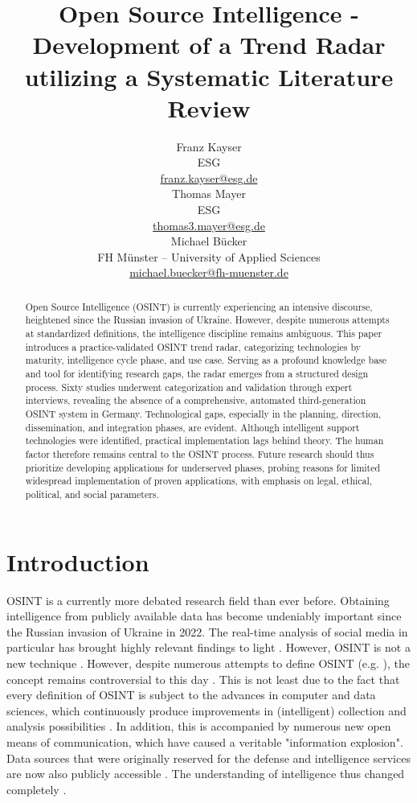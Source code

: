 \documentclass[10pt]{article}
\title{Open Source Intelligence - Development of a Trend Radar utilizing a Systematic Literature Review}
\author{Franz Kayser \\
  ESG \\
  {\underline{ franz.kayser@esg.de}} \\\And
  Thomas Mayer \\
  ESG  \\
  {\underline{ thomas3.mayer@esg.de} }\\\And 
  Michael Bücker \\
  FH Münster -- University of Applied Sciences\\
  {\underline{michael.buecker@fh-muenster.de}} \\}
\date{}
\begin{document}
\maketitle
\begin{abstract}


    Open Source Intelligence (OSINT) is currently experiencing an intensive discourse,
    heightened since the Russian invasion of Ukraine. However, despite numerous attempts
    at standardized definitions, the intelligence discipline remains ambiguous. This paper
    introduces a practice-validated OSINT trend radar, categorizing technologies by maturity,
    intelligence cycle phase, and use case. Serving as a profound knowledge base and tool for
    identifying research gaps, the radar emerges from a structured design process. Sixty
    studies underwent categorization and validation through expert interviews,
    revealing the absence of a comprehensive, automated third-generation OSINT
    system in Germany. Technological gaps, especially in the planning, direction,
    dissemination, and integration phases, are evident. Although intelligent support
    technologies were identified, practical implementation lags behind theory. The human
    factor therefore remains central to the OSINT process. Future research should thus
    prioritize developing applications for underserved phases, probing reasons for limited
    widespread implementation of proven applications, with emphasis on legal, ethical,
    political, and social parameters.


\end{abstract}

\section{Introduction}

OSINT is a currently more debated research field than ever before. Obtaining intelligence
from publicly available data \cite{DosPassos.2017} has become undeniably important since the
Russian invasion of Ukraine in 2022. The real-time analysis of social media in particular has
brought highly relevant findings to light \cite{Hatfield.2023, SmithBoyle.24.07.2023}.
However, OSINT is not a new technique \cite{PastorGalindo.2019, Schaurer.2010}. However, despite
numerous attempts to define OSINT (e.g. \cite{Hwang.2022, PastorGalindo.2020, Yogish.2021}),
the concept remains controversial to this day \cite{Ghioni.2023, Ish.2022,Williams.2018}.
This is not least due to the fact that every definition of OSINT is subject to the advances
in computer and data sciences, which continuously produce improvements in (intelligent)
collection and analysis possibilities \cite{Ghioni.2023, Williams.2018}. In addition, this is
accompanied by numerous new open means of communication, which have caused a veritable
"information explosion"\cite{DosPassos.2017, Hwang.2022, Yogish.2021}.
Data sources that were originally reserved for the defense and intelligence services are
now also publicly accessible \cite{Hwang.2022, Williams.2018}. The understanding of
intelligence thus changed completely \cite{Dokman.2020}.
\end{document}
